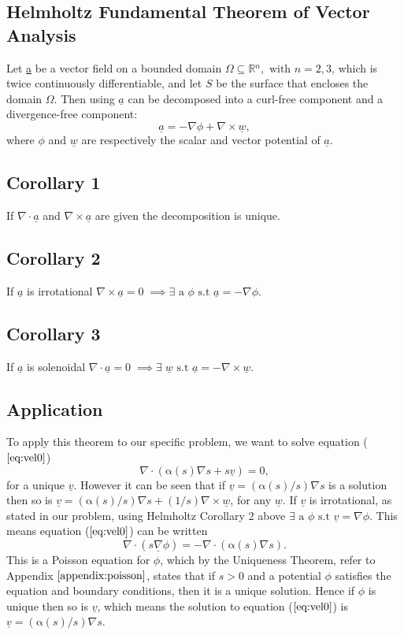 \documentclass[11pt]{article}
\newcommand{\ul}{\underline}
\newcommand{\al}{\mathrm{\alpha}}
\begin{document}
%


\newpage
\appendix
\begin{appendices}
\appendixpage
\section{Helmholtz Fundamental Theorem of Vector Analysis}
\label{appendix:helmholtz}
Let \underline{a} be a vector field on a bounded domain $\Omega \subseteq \mathbb{R}{^n}, \text{ with }n=2,3$, which is twice continuously differentiable, and let $S$ be the surface that encloses the domain $\Omega$. Then using \cite{Griffiths} $\underline{a}$ can be decomposed into a curl-free component and a divergence-free component:
$$\underline{a} =-\nabla\phi+\nabla \times \underline {w},$$
where $\phi$ and $\underline{w}$ are respectively the scalar and vector potential of $\underline{a}$.
\subsection{Corollary 1}
If $\nabla\cdot{\underline{a}}$ and $\nabla\times{\underline{a}}$ are given the decomposition is unique.
\subsection{Corollary 2}
If  $\underline{a}$ is irrotational  $\nabla\times{\underline{a}} = 0\; \implies \exists \text{ a } \phi \text{ s.t } \underline{a} = -\nabla{\phi}$.
\subsection{Corollary 3}
If  $\underline{a}$ is solenoidal  $\nabla\cdot{\underline{a}} = 0\; \implies \exists \; \underline{w} \text{ s.t } \underline{a} = -\nabla\times\underline{w}$.
\subsection{Application}
To apply this theorem to our specific problem, we want to solve equation ($\ref{eq:vel0}$) 
$$\nabla\cdot\left(\al(s)\nabla{s} + s\underline{v}\right)=0,$$ 
for a unique $\ul{v}$. However it can be seen that if $\ul{v} = (\al{(s)}/s)\nabla{s}$ is a solution then so is $\ul{v} = (\al{(s)}/s)\nabla{s} + (1/s)\nabla\times{\ul{w}}$, for any $\ul{w}$.
If $\ul{v}$ is irrotational, as stated in our problem, using Helmholtz Corollary 2 above $ \exists \text{ a } \phi \text{ s.t } \underline{v} = \nabla{\phi}.$
This means equation ($\ref{eq:vel0}$) can be written 
\begin{equation}
\label{eq:Poisson1}
\nabla\cdot(s\underline{\nabla}{\phi}) = - \nabla\cdot(\al(s)\nabla{s}).
\end{equation}
This is a Poisson equation for $\phi$, which by the Uniqueness Theorem, refer to Appendix $\ref{appendix:poisson}$, states that if $s>0$ and a potential $\phi$ satisfies the equation and boundary
 conditions, then it is a unique solution.
Hence if $\phi$ is unique then so is $\ul{v}$, which means the solution to equation ($\ref{eq:vel0}$) is $\ul{v} = (\al{(s)}/s)\nabla{s}$.


\end{appendices}
\end{document}
